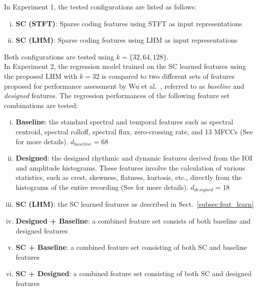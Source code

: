 \documentclass{article}
\begin{document}
In Experiment 1, the tested configurations are listed as follows: %
\begin{enumerate}[(i)]
\item \textbf{SC (STFT)}: Sparse coding features using STFT as input representations
\item \textbf{SC (LHM)}: Sparse coding features using LHM as input representations 
\end{enumerate}
Both configurations are tested using $k = \{32, 64, 128\}$.\\

In Experiment 2, the regression model trained on the SC learned features using the proposed LHM with $k = 32$ is compared to two different sets of features proposed for performance assessment by Wu et al.\ \cite{Wu2016}, referred to as \textit{baseline} and \textit{designed} features. The regression performances of the following feature set combinations are tested:
\begin{enumerate}[(i)]
\item \textbf{Baseline}: the standard spectral and temporal features such as spectral centroid, spectral rolloff, spectral flux, zero-crossing rate, and 13 MFCCs (See \cite{Wu2016} for more details). $d_{baseline} = 68$
\item \textbf{Designed}: the designed rhythmic and dynamic features derived from the IOI and amplitude histograms. These features involve the calculation of various statistics, such as crest, skewness, flatness, kurtosis, etc., directly from the histograms of the entire recording (See \cite{Wu2016} for more details). $d_{designed} = 18$ 

\item \textbf{SC (LHM)}: the SC learned features as described in Sect.~\ref{subsec:feat_learn} %
\item \textbf{Designed + Baseline}: a combined feature set consists of both baseline and designed features %
\item \textbf{SC + Baseline}:  a combined feature set consisting of both SC and baseline features 
\item \textbf{SC + Designed}:  a combined feature set consisting of both SC and designed features 
\end{enumerate}
\end{document}
